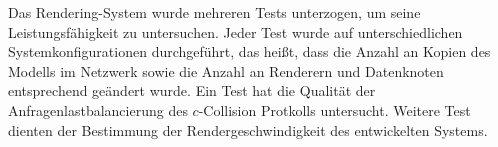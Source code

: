 Das Rendering-System wurde mehreren Tests unterzogen, um seine Leistungsfähigkeit zu untersuchen. Jeder Test wurde auf unterschiedlichen Systemkonfigurationen durchgeführt, das heißt, dass die Anzahl an Kopien des Modells im Netzwerk sowie die Anzahl an Renderern und Datenknoten entsprechend geändert wurde. Ein Test hat die Qualität der Anfragenlastbalancierung des $c$-Collision Protkolls untersucht. Weitere Test dienten der Bestimmung der Rendergeschwindigkeit des entwickelten Systems.


%
%
